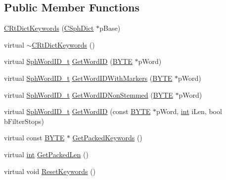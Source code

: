 \subsection*{Public Member Functions}
\begin{DoxyCompactItemize}
\item 
\hyperlink{classCRtDictKeywords_ab5f89077bbcbd351f74f6726e98c7b68}{C\-Rt\-Dict\-Keywords} (\hyperlink{classCSphDict}{C\-Sph\-Dict} $\ast$p\-Base)
\item 
virtual \hyperlink{classCRtDictKeywords_a72078bf1dda3bb609d719e57adbac314}{$\sim$\-C\-Rt\-Dict\-Keywords} ()
\item 
virtual \hyperlink{sphinx_8h_a80a94d5984fdf9214a98f3e5e65df963}{Sph\-Word\-I\-D\-\_\-t} \hyperlink{classCRtDictKeywords_a85bdaaab5baf95ae8a3fabc4c106416f}{Get\-Word\-I\-D} (\hyperlink{sphinxstd_8h_a4ae1dab0fb4b072a66584546209e7d58}{B\-Y\-T\-E} $\ast$p\-Word)
\item 
virtual \hyperlink{sphinx_8h_a80a94d5984fdf9214a98f3e5e65df963}{Sph\-Word\-I\-D\-\_\-t} \hyperlink{classCRtDictKeywords_a8f7960354935b8c721f592d9b6f93078}{Get\-Word\-I\-D\-With\-Markers} (\hyperlink{sphinxstd_8h_a4ae1dab0fb4b072a66584546209e7d58}{B\-Y\-T\-E} $\ast$p\-Word)
\item 
virtual \hyperlink{sphinx_8h_a80a94d5984fdf9214a98f3e5e65df963}{Sph\-Word\-I\-D\-\_\-t} \hyperlink{classCRtDictKeywords_afae093563fee10fd4fde11c8035390ee}{Get\-Word\-I\-D\-Non\-Stemmed} (\hyperlink{sphinxstd_8h_a4ae1dab0fb4b072a66584546209e7d58}{B\-Y\-T\-E} $\ast$p\-Word)
\item 
virtual \hyperlink{sphinx_8h_a80a94d5984fdf9214a98f3e5e65df963}{Sph\-Word\-I\-D\-\_\-t} \hyperlink{classCRtDictKeywords_ab351b606c55539e02830ed07273489aa}{Get\-Word\-I\-D} (const \hyperlink{sphinxstd_8h_a4ae1dab0fb4b072a66584546209e7d58}{B\-Y\-T\-E} $\ast$p\-Word, \hyperlink{sphinxexpr_8cpp_a4a26e8f9cb8b736e0c4cbf4d16de985e}{int} i\-Len, bool b\-Filter\-Stops)
\item 
virtual const \hyperlink{sphinxstd_8h_a4ae1dab0fb4b072a66584546209e7d58}{B\-Y\-T\-E} $\ast$ \hyperlink{classCRtDictKeywords_aa6bec7a20393f3729340bab4d0daba78}{Get\-Packed\-Keywords} ()
\item 
virtual \hyperlink{sphinxexpr_8cpp_a4a26e8f9cb8b736e0c4cbf4d16de985e}{int} \hyperlink{classCRtDictKeywords_ab0f9f720c9e7040935be1960f8de4e7e}{Get\-Packed\-Len} ()
\item 
virtual void \hyperlink{classCRtDictKeywords_ab713aff4ba694293743f21805140d95d}{Reset\-Keywords} ()
\item 

\end{DoxyCompactItemize}
